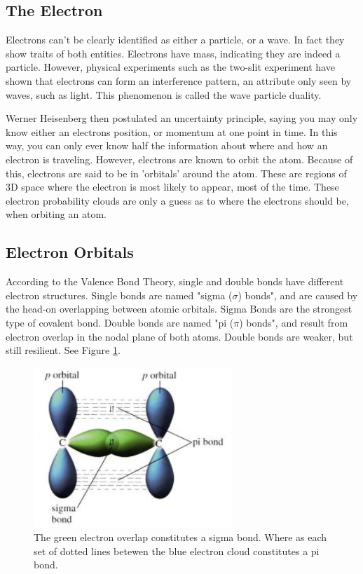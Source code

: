 \documentclass[12pt]{article}
\begin{document}
\subsection{The Electron}
Electrons can't be clearly identified as either a particle, or a wave. In fact they show traits of both entities. Electrons have mass, indicating they are indeed a particle. However, physical experiments such as the two-slit experiment have shown that electrons can form an interference pattern, an attribute only seen by waves, such as light. This phenomenon is called the wave particle duality. 

Werner Heisenberg then postulated an uncertainty principle, saying you may only know either an electrons position, or momentum at one point in time. In this way, you can only ever know half the information about where and how an electron is traveling. However, electrons are known to orbit the atom. Because of this, electrons are said to be in 'orbitals' around the atom. These are regions of 3D space where the electron is most likely to appear, most of the time. These electron probability clouds are only a guess as to where the electrons should be, when orbiting an atom.
 
\subsection{Electron Orbitals}
According to the Valence Bond Theory, single and double bonds have different electron structures. Single bonds are named "sigma ($\sigma$) bonds", and are caused by the head-on overlapping between atomic orbitals. Sigma Bonds are the strongest type of covalent bond. Double bonds are named "pi ($\pi$) bonds", and result from electron overlap in the nodal plane of both atoms. Double bonds are weaker, but still resilient. See Figure \ref{fig:bonds}.

\begin{figure}[ht!]
\centering
\includegraphics[width=75mm]{bonds.png}
\caption{The green electron overlap constitutes a sigma bond. Where as each set of dotted lines betewen the blue electron cloud constitutes a pi bond.}
\label{fig:bonds}
\end{figure}
\end{document}
